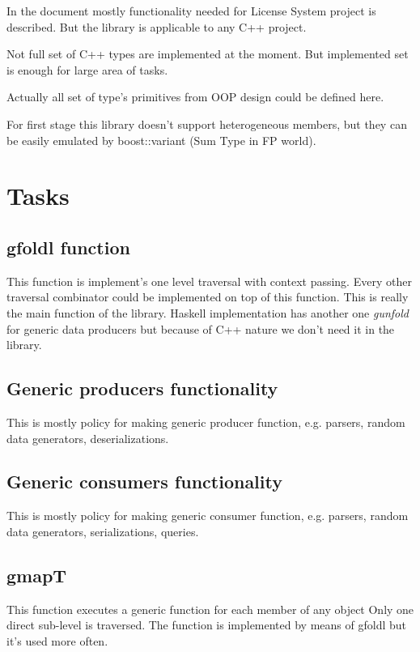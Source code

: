 \documentclass[a4paper]{article}
\begin{document}
In the document mostly functionality needed for License System project is described. But the library is applicable to any C++ project.

Not full set of C++ types are implemented at the moment. But implemented set is enough for large area of tasks.

Actually all set of type's primitives from OOP design could be defined here.

For first stage this library doesn't support heterogeneous members, but they can be easily emulated by boost::variant (Sum Type in FP world).

\section{Tasks}

\subsection{gfoldl function}

This function is implement's one level traversal with context passing.
Every other traversal combinator could be implemented on top of this function.
This is really the main function of the library.
Haskell implementation has another one \emph{gunfold} for generic data producers
but because of C++ nature we don't need it in the library.

\subsection{Generic producers functionality}

This is mostly policy for making generic producer function, e.g. parsers, random data generators, deserializations.

\subsection{Generic consumers functionality}

This is mostly policy for making generic consumer function, e.g. parsers, random data generators, serializations, queries.

\subsection{gmapT}
This function executes a generic function for each member of any object 
Only one direct sub-level is traversed.
The function is implemented by means of gfoldl but it's used more often.
\end{document}
